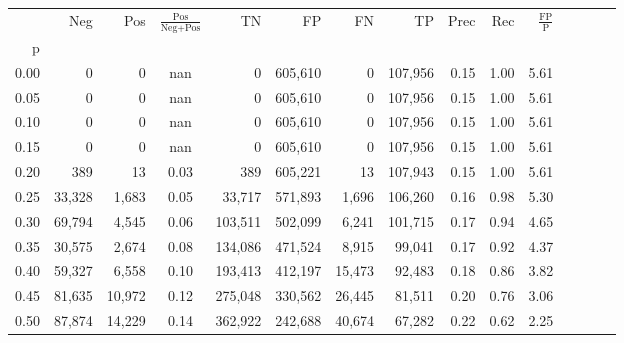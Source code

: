 \begin{tabular}{rrrcrrrrrrrrrrr}
\toprule
{} &     Neg &     Pos & $\frac{\text{Pos}}{\text{Neg}+\text{Pos}}$ &       TN &       FP &       FN &       TP &  Prec &   Rec & $\frac{\text{FP}}{\text{P}}$ \\
p    &         &         &                                            &          &          &          &          &       &       &                              \\
\midrule
0.00 &       0 &       0 &                                        nan &        0 &  605,610 &        0 &  107,956 &  0.15 &  1.00 &                         5.61 \\
0.05 &       0 &       0 &                                        nan &        0 &  605,610 &        0 &  107,956 &  0.15 &  1.00 &                         5.61 \\
0.10 &       0 &       0 &                                        nan &        0 &  605,610 &        0 &  107,956 &  0.15 &  1.00 &                         5.61 \\
0.15 &       0 &       0 &                                        nan &        0 &  605,610 &        0 &  107,956 &  0.15 &  1.00 &                         5.61 \\
0.20 &     389 &      13 &                                       0.03 &      389 &  605,221 &       13 &  107,943 &  0.15 &  1.00 &                         5.61 \\
0.25 &  33,328 &   1,683 &                                       0.05 &   33,717 &  571,893 &    1,696 &  106,260 &  0.16 &  0.98 &                         5.30 \\
0.30 &  69,794 &   4,545 &                                       0.06 &  103,511 &  502,099 &    6,241 &  101,715 &  0.17 &  0.94 &                         4.65 \\
0.35 &  30,575 &   2,674 &                                       0.08 &  134,086 &  471,524 &    8,915 &   99,041 &  0.17 &  0.92 &                         4.37 \\
0.40 &  59,327 &   6,558 &                                       0.10 &  193,413 &  412,197 &   15,473 &   92,483 &  0.18 &  0.86 &                         3.82 \\
0.45 &  81,635 &  10,972 &                                       0.12 &  275,048 &  330,562 &   26,445 &   81,511 &  0.20 &  0.76 &                         3.06 \\
0.50 &  87,874 &  14,229 &                                       0.14 &  362,922 &  242,688 &   40,674 &   67,282 &  0.22 &  0.62 &                         2.25 \\

\end{tabular}
